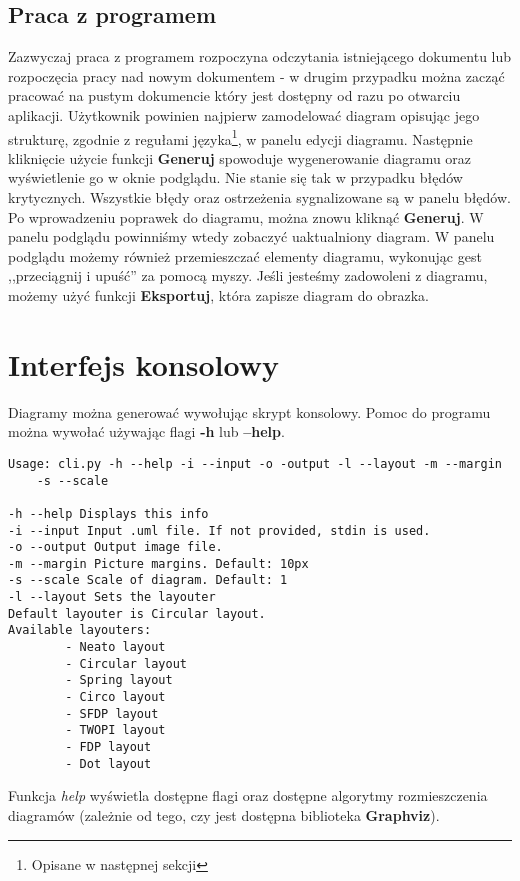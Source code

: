 \subsection{Praca z programem}

Zazwyczaj praca z programem rozpoczyna odczytania istniejącego dokumentu lub rozpoczęcia pracy nad nowym dokumentem - w drugim przypadku można zacząć pracować na pustym dokumencie który jest dostępny od razu po otwarciu aplikacji. Użytkownik powinien najpierw zamodelować diagram opisując jego strukturę, zgodnie z regułami języka\footnote{Opisane w następnej sekcji}, w panelu edycji diagramu. Następnie kliknięcie użycie funkcji \textbf{Generuj} spowoduje wygenerowanie diagramu oraz wyświetlenie go w oknie podglądu. Nie stanie się tak w przypadku błędów krytycznych. Wszystkie błędy oraz ostrzeżenia sygnalizowane są w panelu błędów. Po wprowadzeniu poprawek do diagramu, można znowu kliknąć \textbf{Generuj}. W panelu podglądu powinniśmy wtedy zobaczyć uaktualniony diagram. W panelu podglądu możemy również przemieszczać elementy diagramu, wykonując gest ,,przeciągnij i upuść'' za pomocą myszy. Jeśli jesteśmy zadowoleni z diagramu, możemy użyć funkcji \textbf{Eksportuj}, która zapisze diagram do obrazka.

\section{Interfejs konsolowy}

Diagramy można generować wywołując skrypt konsolowy. Pomoc do programu można wywołać używając flagi \textbf{-h} lub \textbf{--help}.

\begin{lstlisting}
Usage: cli.py -h --help -i --input -o -output -l --layout -m --margin 
	-s --scale
	
-h --help Displays this info
-i --input Input .uml file. If not provided, stdin is used.
-o --output Output image file.
-m --margin Picture margins. Default: 10px
-s --scale Scale of diagram. Default: 1
-l --layout Sets the layouter
Default layouter is Circular layout.
Available layouters:
        - Neato layout
        - Circular layout
        - Spring layout
        - Circo layout
        - SFDP layout
        - TWOPI layout
        - FDP layout
        - Dot layout
\end{lstlisting}

Funkcja \emph{help} wyświetla dostępne flagi oraz dostępne algorytmy rozmieszczenia diagramów (zależnie od tego, czy jest dostępna biblioteka \textbf{Graphviz}).

